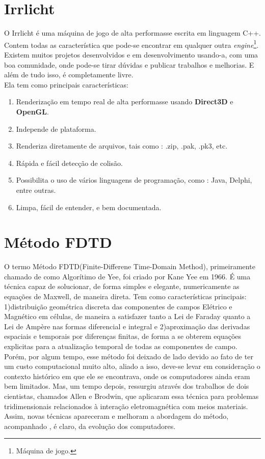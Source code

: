 \section{Irrlicht}
O Irrlicht é uma máquina de jogo de alta performasse escrita em linguagem C++\cite{irrlichtbook}. Contem todas as característica que pode-se encontrar em qualquer outra \textit{engine}\footnote{Máquina de jogo.}. Existem muitos projetos desenvolvidos e em desenvolvimento usando-a, com uma boa comunidade, onde pode-se tirar dúvidas e publicar trabalhos e melhorias. E além de tudo isso, é completamente livre\cite{irrlicht}.\\

Ela tem como principais características:
\begin{enumerate}
\item Renderização em tempo real de alta performasse usando \textbf{Direct3D} e \textbf{OpenGL}.
\item Independe de plataforma.
\item Renderiza diretamente de arquivos, tais como : .zip, .pak, .pk3, etc.
\item Rápida e fácil detecção de colisão.
\item Possibilita o uso de vários linguagens de programação, como : Java, Delphi, entre outras.
\item Limpa, fácil de entender, e bem documentada.
\end{enumerate}

\section{Método FDTD}
O termo Método FDTD(Finite-Differene Time-Domain Method), primeiramente chamado de como Algorítimo de Yee, foi criado por Kane Yee em 1966\cite{yeebook}. É uma técnica capaz de solucionar, de forma simples e elegante, numericamente as equações de Maxwell, de maneira direta. Tem como características principais: 1)distribuição geométrica discreta das componentes de campos Elétrico e Magnético em células, de maneira a satisfazer tanto a Lei de Faraday quanto a Lei de Ampère nas formas diferencial e integral e 2)aproximação das derivadas espaciais e temporais por diferenças finitas, de forma a se obterem equações explicitas para a atualização temporal de todas as componentes de campo\cite{rodrigo}.\\

Porém, por algum tempo, esse método foi deixado de lado devido ao fato de ter um custo computacional muito alto, aliado a isso, deve-se levar em consideração o contexto histórico em que ele se encontrava, onde os computadores ainda eram bem limitados. Mas, um tempo depois, ressurgiu através dos trabalhos de dois cientistas, chamados Allen e Brodwin, que aplicaram essa técnica para problemas tridimensionais relacionados à interação eletromagnética com meios materiais\cite{allen}. Assim, novas técnicas apareceram e melhoram a abordagem do método, acompanhado , é claro, da evolução dos computadores.\\

